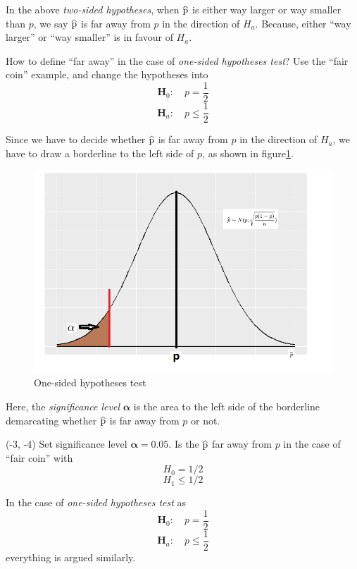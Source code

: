 \documentclass[a4paper, 12pt,twoside]{book}
\newcommand\reallywidehat[1]{%
\savestack{\tmpbox}{\stretchto{%
  \scaleto{%
    \scalerel*[\widthof{\ensuremath{#1}}]{\kern-.6pt\bigwedge\kern-.6pt}%
    {\rule[-\textheight/2]{1ex}{\textheight}}%
  }{\textheight}%
}{0.5ex}}%
\stackon[1pt]{#1}{\tmpbox}%
}
\begin{document}
\begin{itemize}
In the above \textit{two-sided hypotheses}, when $\reallywidehat{p}$ is either way larger or way smaller than $p$, we say $\reallywidehat{p}$ is far away from $p$ in the direction of $H_a$. Because, either ``way larger'' or ``way smaller'' is in favour of $H_a$.\vspace{0.3cm}

How to define ``far away'' in the case of \textit{one-sided hypotheses test}? Use the ``fair coin'' example, and change the hypotheses into 
    $$\textbf{H}_0:\quad p=\frac{1}{2}$$
$$\textbf{H}_a:\quad p\leq \frac{1}{2}$$ 

Since we have to decide whether  $\reallywidehat{p}$ is far away from $p$ in the direction of $H_a$, we have to draw a borderline to the left side of $p$, as shown in figure\ref{OneSidedHT}.    
     \begin{figure}[H]
     \centering
     \includegraphics[scale=0.6]{OneSidedHT}
     \caption{One-sided hypotheses test}
     \label{OneSidedHT}
     \end{figure}
Here, the \textit{significance level} $\mathbf{\alpha}$ is the area to the left side of the borderline demarcating whether $\reallywidehat{p}$ is far away from $p$ or not.

\begin{textblock}{3.6}(-3, -4)
Set significance level $\mathbf{\alpha} = 0.05$. Is the $\reallywidehat{p}$ far away from $p$ in the case of ``fair coin'' with $$H_0 = 1/2$$ $$H_1 \leq 1/2$$
\end{textblock}
\vspace{0.6cm}

In the case of \textit{one-sided hypotheses test} as
    $$\textbf{H}_0:\quad p=\frac{1}{2}$$
$$\textbf{H}_a:\quad p\leq \frac{1}{2}$$ 
everything is argued similarly.\vspace{0.6cm}


\end{itemize}
\end{document}
